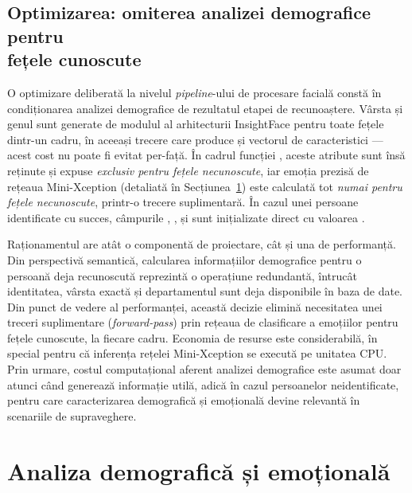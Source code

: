 \documentclass[../../main.tex]{subfiles}
\begin{document}
\subsection{Optimizarea: omiterea analizei demografice pentru \\ fețele cunoscute}
\label{subsec:optimizare_demografica}

O optimizare deliberată la nivelul \emph{pipeline}-ului de procesare facială constă în condiționarea analizei demografice de rezultatul etapei de recunoaștere. Vârsta și genul sunt generate de modulul  al arhitecturii InsightFace pentru toate fețele dintr-un cadru, în aceeași trecere care produce și vectorul de caracteristici --- acest cost nu poate fi evitat per-față. În cadrul funcției , aceste atribute sunt însă reținute și expuse \emph{exclusiv pentru fețele necunoscute}, iar emoția prezisă de rețeaua Mini-Xception (detaliată în Secțiunea~\ref{sec:analiza_demografica}) este calculată tot \emph{numai pentru fețele necunoscute}, printr-o trecere suplimentară. În cazul unei persoane identificate cu succes, câmpurile , ,  și  sunt inițializate direct cu valoarea .

Raționamentul are atât o componentă de proiectare, cât și una de performanță. Din perspectivă semantică, calcularea informațiilor demografice pentru o persoană deja recunoscută reprezintă o operațiune redundantă, întrucât identitatea, vârsta exactă și departamentul sunt deja disponibile în baza de date. Din punct de vedere al performanței, această decizie elimină necesitatea unei treceri suplimentare (\emph{forward-pass}) prin rețeaua de clasificare a emoțiilor pentru fețele cunoscute, la fiecare cadru. Economia de resurse este considerabilă, în special pentru că inferența rețelei Mini-Xception se execută pe unitatea CPU. Prin urmare, costul computațional aferent analizei demografice este asumat doar atunci când generează informație utilă, adică în cazul persoanelor neidentificate,  pentru care caracterizarea demografică și emoțională devine relevantă în scenariile de supraveghere.

\section{Analiza demografică și emoțională}
\label{sec:analiza_demografica}
\end{document}
